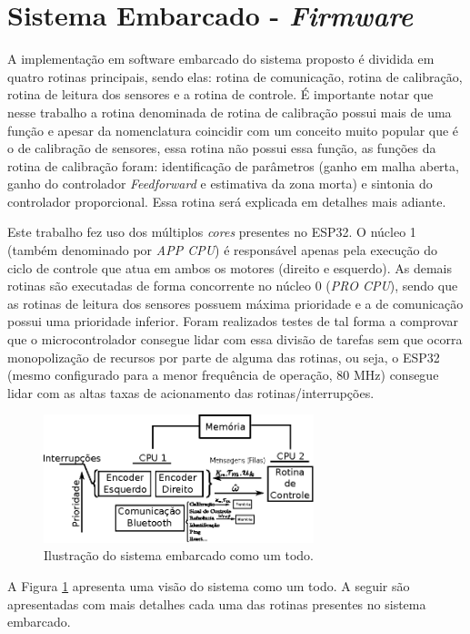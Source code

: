 \section{Sistema Embarcado - \emph{Firmware}}
\label{sec:sistema_embarcado}

A implementação em software embarcado do sistema proposto é dividida em quatro rotinas principais, sendo elas: rotina de comunicação, rotina de calibração, rotina de leitura dos sensores  e a rotina de controle. É importante notar que nesse trabalho a rotina denominada de rotina de calibração possui mais de uma função e apesar da nomenclatura coincidir com um conceito muito popular que é o de calibração de sensores, essa rotina não possui essa função, as funções da rotina de calibração foram: identificação de parâmetros (ganho em malha aberta, ganho do controlador \emph{Feedforward} e estimativa da zona morta) e sintonia do controlador proporcional. Essa rotina será explicada em detalhes mais adiante.

Este trabalho fez uso dos múltiplos \emph{cores} presentes no ESP32. O núcleo 1 (também denominado por \emph{APP CPU}) é responsável apenas pela execução do ciclo de controle que atua em ambos os motores (direito e esquerdo). 
As demais rotinas são executadas de forma concorrente no núcleo 0 (\emph{PRO CPU}), sendo que as rotinas de leitura dos sensores possuem máxima prioridade e a de comunicação possui uma prioridade inferior. Foram realizados testes de tal forma a comprovar que o microcontrolador consegue lidar com essa 
divisão de tarefas sem que ocorra monopolização de recursos por parte de alguma das rotinas, ou seja, o ESP32 (mesmo configurado para a menor frequência de operação, 80 MHz) consegue lidar com as altas taxas de acionamento das rotinas/interrupções. 


\begin{figure}[H]
    \centering
    \includegraphics[width=0.7\textwidth]{figuras/ilustracoes/visao_geral_do_sistema.eps}
    \caption{Ilustração do sistema embarcado como um todo.}
    \label{fig:organizacao_firmware}
\end{figure}

A Figura \ref{fig:organizacao_firmware} apresenta uma visão do sistema como um todo. A seguir são apresentadas com mais detalhes cada uma das rotinas presentes no sistema embarcado.




